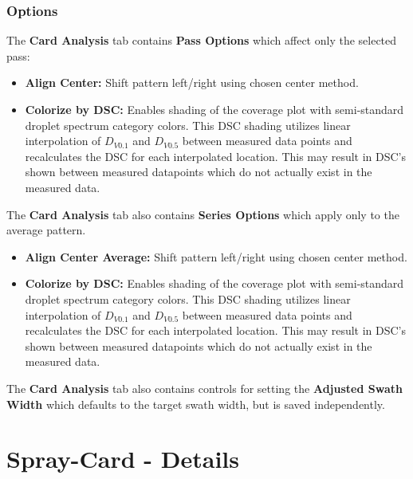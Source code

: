\documentclass[10pt,letterpaper,titlepage]{article}
\begin{document}
    \subsubsection{Options}
    The \textbf{Card Analysis} tab contains \textbf{Pass Options} which affect only the selected pass:
    \begin{itemize}
        \item \textbf{Align Center:} Shift pattern left/right using chosen center method.
        \item \textbf{Colorize by DSC:} Enables shading of the coverage plot with semi-standard droplet spectrum category colors. \color{red}This DSC shading utilizes linear interpolation of $D_{V0.1}$ and $D_{V0.5}$ between measured data points and recalculates the DSC for each interpolated location. This may result in DSC's shown between measured datapoints which do not actually exist in the measured data.\color{black}
    \end{itemize}
    The \textbf{Card Analysis} tab also contains \textbf{Series Options} which apply only to the average pattern.
    \begin{itemize}
        \item \textbf{Align Center Average:} Shift pattern left/right using chosen center method.
        \item \textbf{Colorize by DSC:} Enables shading of the coverage plot with semi-standard droplet spectrum category colors. \color{red}This DSC shading utilizes linear interpolation of $D_{V0.1}$ and $D_{V0.5}$ between measured data points and recalculates the DSC for each interpolated location. This may result in DSC's shown between measured datapoints which do not actually exist in the measured data.\color{black}
    \end{itemize}
    The \textbf{Card Analysis} tab also contains controls for setting the \textbf{Adjusted Swath Width} which defaults to the target swath width, but is saved independently.

    \newpage

    \section{Spray-Card - Details}
\end{document}
